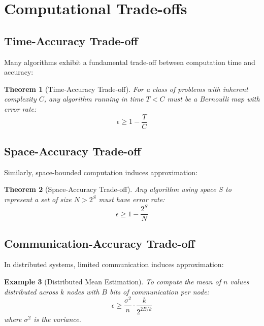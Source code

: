 \documentclass[11pt,final,hidelinks]{article}
\newtheorem{theorem}{Theorem}[section]
\newtheorem{example}[theorem]{Example}
\newcommand{\error}{\epsilon}
\begin{document}
\section{Computational Trade-offs}

\subsection{Time-Accuracy Trade-off}

Many algorithms exhibit a fundamental trade-off between computation time and accuracy:

\begin{theorem}[Time-Accuracy Trade-off]
For a class of problems with inherent complexity $C$, any algorithm running in time $T < C$ must be a Bernoulli map with error rate:
\begin{equation}
\error \geq 1 - \frac{T}{C}
\end{equation}
\end{theorem}

\subsection{Space-Accuracy Trade-off}

Similarly, space-bounded computation induces approximation:

\begin{theorem}[Space-Accuracy Trade-off]
Any algorithm using space $S$ to represent a set of size $N > 2^S$ must have error rate:
\begin{equation}
\error \geq 1 - \frac{2^S}{N}
\end{equation}
\end{theorem}

\subsection{Communication-Accuracy Trade-off}

In distributed systems, limited communication induces approximation:

\begin{example}[Distributed Mean Estimation]
To compute the mean of $n$ values distributed across $k$ nodes with $B$ bits of communication per node:
\begin{equation}
\error \geq \frac{\sigma^2}{n} \cdot \frac{k}{2^{2B/k}}
\end{equation}
where $\sigma^2$ is the variance.
\end{example}
\end{document}
